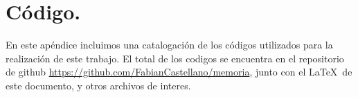 \chapter{Código.}\label{appB}

En este ap\'endice incluimos una catalogaci\'on de los c\'odigos utilizados para la realizaci\'on de este trabajo. El total de los codigos se encuentra en el repositorio de github \url{https://github.com/FabianCastellano/memoria}, junto con el \LaTeX \ de este documento, y otros archivos de interes. 
